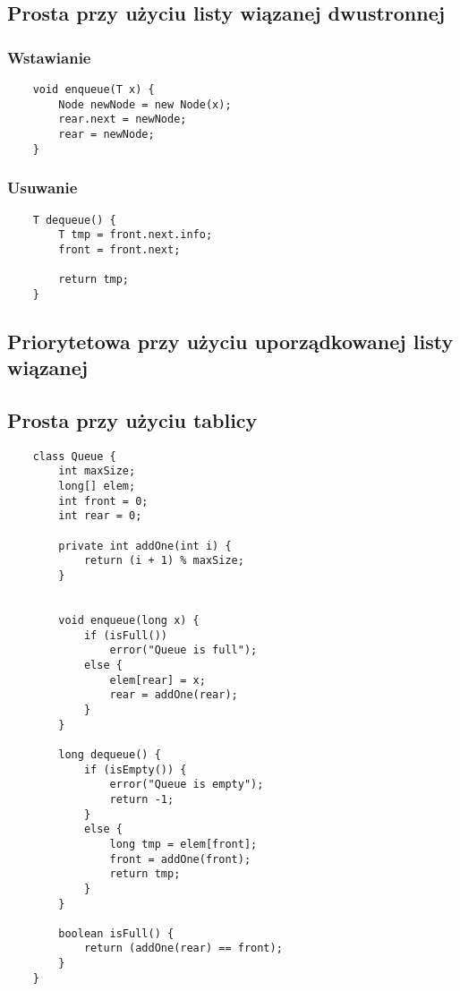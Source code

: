 \documentclass[algorytmy.tex]{subfiles}
\begin{document}
    \subsection{Prosta przy użyciu listy wiązanej dwustronnej}
    \subsubsection{Wstawianie}
    \begin{verbatim}
    void enqueue(T x) {
        Node newNode = new Node(x);
        rear.next = newNode;
        rear = newNode;
    }
   \end{verbatim}

    \subsubsection{Usuwanie}
    \begin{verbatim}
    T dequeue() {
        T tmp = front.next.info;
        front = front.next;

        return tmp;
    }
   \end{verbatim}

    \subsection{Priorytetowa przy użyciu uporządkowanej listy wiązanej}

    \pagebreak
    \subsection{Prosta przy użyciu tablicy}
    \begin{verbatim}
    class Queue {
        int maxSize;
        long[] elem;
        int front = 0;
        int rear = 0;

        private int addOne(int i) {
            return (i + 1) % maxSize;
        }


        void enqueue(long x) {
            if (isFull())
                error("Queue is full");
            else {
                elem[rear] = x;
                rear = addOne(rear);
            }
        }

        long dequeue() {
            if (isEmpty()) {
                error("Queue is empty");
                return -1;
            }
            else {
                long tmp = elem[front];
                front = addOne(front);
                return tmp;
            }
        }

        boolean isFull() {
            return (addOne(rear) == front);
        }
    }
   \end{verbatim}
\end{document}
